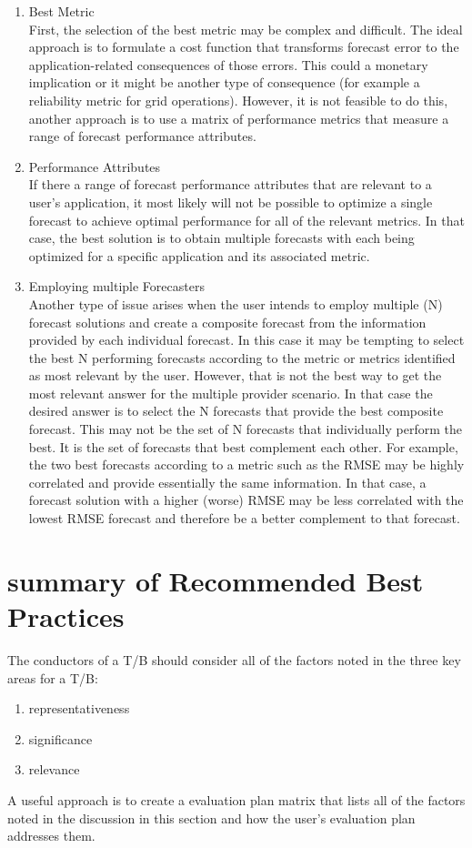 \begin{enumerate} 
    \item Best Metric\\
First, the selection of the best metric may be complex and difficult.  The ideal approach is to formulate a cost function that transforms forecast error to the application-related consequences of those errors.  This could a monetary implication or it might be another type of consequence (for example a reliability metric for grid operations).  However, it is not feasible to do this, another approach is to use a matrix of performance metrics that measure a range of forecast performance attributes.
    \item Performance Attributes \\
If there a range of forecast performance attributes that are relevant to a user’s application, it most likely will not be possible to optimize a single forecast to achieve optimal performance for all of the relevant metrics. In that case, the best solution is to obtain multiple forecasts with each being optimized for a specific application and its associated metric. 
    \item Employing multiple Forecasters \\
Another type of issue arises when the user intends to employ multiple (N) forecast solutions and create a composite forecast from the information provided by each individual forecast. In this case it may be tempting to select the best N performing forecasts according to the metric or metrics identified as most relevant by the user.  However, that is not the best way to get the most relevant answer for the multiple provider scenario.  In that case the desired answer is to select the N forecasts that provide the best composite forecast.  This may not be the set of N forecasts that individually perform the best.  It is the set of forecasts that best complement each other.  For example, the two best forecasts according to a metric such as the RMSE may be highly correlated and provide essentially the same information.  In that case, a forecast solution with a higher (worse) RMSE may be less correlated with the lowest RMSE forecast and therefore be a better complement to that forecast.  
\end{enumerate}

\section{summary of Recommended Best Practices}

The conductors of a T/B should consider all of the factors noted in the three key areas for a T/B:
\begin{enumerate}
    \item representativeness
    \item significance
    \item relevance
\end{enumerate}

A useful approach is to create a evaluation plan matrix that lists all of the factors noted in the discussion in this section and how the user’s evaluation plan addresses them.
